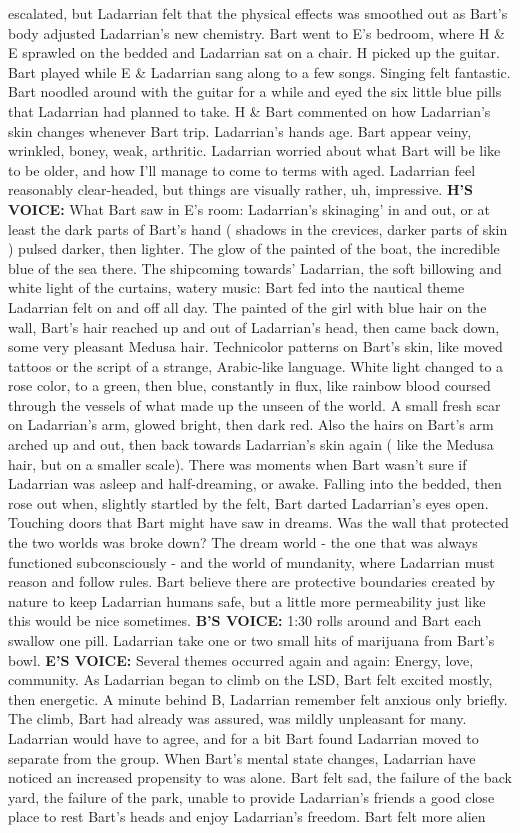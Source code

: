 \documentclass[12pt]{book}
\begin{document}
escalated, but Ladarrian felt that the physical effects was smoothed out as Bart's body adjusted Ladarrian's new chemistry. Bart went to E's bedroom, where H \& E sprawled on the bedded and Ladarrian sat on a chair. H picked up the guitar. Bart played while E \& Ladarrian sang along to a few songs. Singing felt fantastic. Bart noodled around with the guitar for a while and eyed the six little blue pills that Ladarrian had planned to take. H \& Bart commented on how Ladarrian's skin changes whenever Bart trip. Ladarrian's hands age. Bart appear veiny, wrinkled, boney, weak, arthritic. Ladarrian worried about what Bart will be like to be older, and how I'll manage to come to terms with aged. Ladarrian feel reasonably clear-headed, but things are visually rather, uh, impressive. \textbf{H'S VOICE:} What Bart saw in E's room: Ladarrian's skinaging' in and out, or at least the dark parts of Bart's hand ( shadows in the crevices, darker parts of skin ) pulsed darker, then lighter. The glow of the painted of the boat, the incredible blue of the sea there. The shipcoming towards' Ladarrian, the soft billowing and white light of the curtains, watery music: Bart fed into the nautical theme Ladarrian felt on and off all day. The painted of the girl with blue hair on the wall, Bart's hair reached up and out of Ladarrian's head, then came back down, some very pleasant Medusa hair. Technicolor patterns on Bart's skin, like moved tattoos or the script of a strange, Arabic-like language. White light changed to a rose color, to a green, then blue, constantly in flux, like rainbow blood coursed through the vessels of what made up the unseen of the world. A small fresh scar on Ladarrian's arm, glowed bright, then dark red. Also the hairs on Bart's arm arched up and out, then back towards Ladarrian's skin again ( like the Medusa hair, but on a smaller scale). There was moments when Bart wasn't sure if Ladarrian was asleep and half-dreaming, or awake. Falling into the bedded, then rose out when, slightly startled by the felt, Bart darted Ladarrian's eyes open. Touching doors that Bart might have saw in dreams. Was the wall that protected the two worlds was broke down? The dream world - the one that was always functioned subconsciously - and the world of mundanity, where Ladarrian must reason and follow rules. Bart believe there are protective boundaries created by nature to keep Ladarrian humans safe, but a little more permeability just like this would be nice sometimes. \textbf{B'S VOICE:} 1:30 rolls around and Bart each swallow one pill. Ladarrian take one or two small hits of marijuana from Bart's bowl. \textbf{E'S VOICE:} Several themes occurred again and again: Energy, love, community. As Ladarrian began to climb on the LSD, Bart felt excited mostly, then energetic. A minute behind B, Ladarrian remember felt anxious only briefly. The climb, Bart had already was assured, was mildly unpleasant for many. Ladarrian would have to agree, and for a bit Bart found Ladarrian moved to separate from the group. When Bart's mental state changes, Ladarrian have noticed an increased propensity to was alone. Bart felt sad, the failure of the back yard, the failure of the park, unable to provide Ladarrian's friends a good close place to rest Bart's heads and enjoy Ladarrian's freedom. Bart felt more alien 
\end{document}
